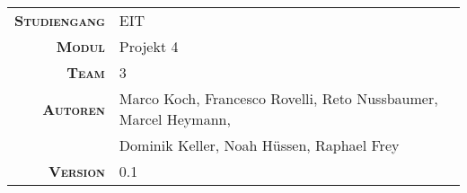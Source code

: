\begin{titlepage}

    \maketitle

    \vspace{60mm}

    \begin{tabular}{r|l}

        \textsc{\textbf{Studiengang}}
        & EIT\\
        [4mm]

        \textsc{\textbf{Modul}}
        & Projekt 4 \\
        [4mm]

        \textsc{\textbf{Team}}
        & 3 \\
        [4mm]

        \textsc{\textbf{Autoren}}
        & Marco Koch, Francesco Rovelli, Reto Nussbaumer, Marcel Heymann, \\
        & Dominik Keller, Noah H\"ussen, Raphael Frey\\
        [4mm]

        \textsc{\textbf{Version}}
        & 0.1 \\
    \end{tabular}

\end{titlepage}
